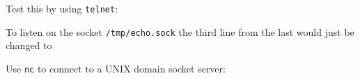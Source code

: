 \begin{Shaded}
\begin{Highlighting}[]
 \NormalTok{);}
 \NormalTok{(}
  \NormalTok{(}\NormalTok{);}
  \NormalTok{(}\NormalTok{, }\NormalTok{() \{}
    \NormalTok{(}\NormalTok{);}
  \NormalTok{\});}
  \NormalTok{(}\NormalTok{);}
\NormalTok{\});}
\NormalTok{(}\NormalTok{, }\NormalTok{() \{ }
  \NormalTok{(}\NormalTok{);}
\NormalTok{\});}
\end{Highlighting}
\end{Shaded}

Test this by using \texttt{telnet}:

\begin{Shaded}
\begin{Highlighting}[]
\end{Highlighting}
\end{Shaded}

To listen on the socket \texttt{/tmp/echo.sock} the third line from the
last would just be changed to

\begin{Shaded}
\begin{Highlighting}[]
\NormalTok{(}\NormalTok{, }\NormalTok{() \{ }
\end{Highlighting}
\end{Shaded}

Use \texttt{nc} to connect to a UNIX domain socket server:

\begin{Shaded}
\begin{Highlighting}[]
\end{Highlighting}
\end{Shaded}

